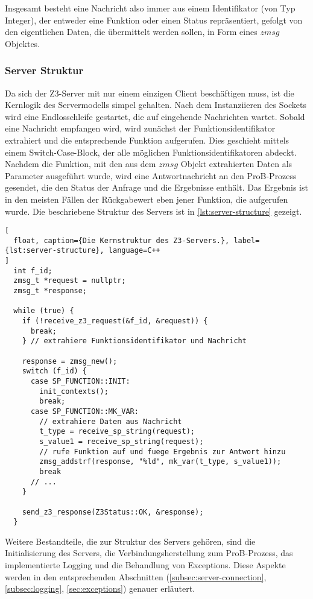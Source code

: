 Insgesamt besteht eine Nachricht also immer aus einem Identifikator (von Typ Integer), der entweder eine Funktion oder einen Status repräsentiert,
gefolgt von den eigentlichen Daten, die übermittelt werden sollen, in Form eines $zmsg$ Objektes.

\subsubsection{Server Struktur}

Da sich der Z3-Server mit nur einem einzigen Client beschäftigen muss, ist die Kernlogik des Servermodells simpel gehalten.
Nach dem Instanziieren des Sockets wird eine Endlosschleife gestartet, die auf eingehende Nachrichten wartet.
Sobald eine Nachricht empfangen wird, wird zunächst der Funktionsidentifikator extrahiert und die entsprechende Funktion aufgerufen.
Dies geschieht mittels einem Switch-Case-Block, der alle möglichen Funktionsidentifikatoren abdeckt.
Nachdem die Funktion, mit den aus dem $zmsg$ Objekt extrahierten Daten als Parameter ausgeführt wurde,
wird eine Antwortnachricht an den ProB-Prozess gesendet, die den Status der Anfrage und die Ergebnisse enthält.
Das Ergebnis ist in den meisten Fällen der Rückgabewert eben jener Funktion, die aufgerufen wurde.
Die beschriebene Struktur des Servers ist in \cref{lst:server-structure} gezeigt.

\begin{lstlisting}[
  float, caption={Die Kernstruktur des Z3-Servers.}, label={lst:server-structure}, language=C++
]
  int f_id;
  zmsg_t *request = nullptr;
  zmsg_t *response;

  while (true) {
    if (!receive_z3_request(&f_id, &request)) {
      break;
    } // extrahiere Funktionsidentifikator und Nachricht

    response = zmsg_new();
    switch (f_id) {
      case SP_FUNCTION::INIT:
        init_contexts();
        break;
      case SP_FUNCTION::MK_VAR:
        // extrahiere Daten aus Nachricht
        t_type = receive_sp_string(request);
        s_value1 = receive_sp_string(request);
        // rufe Funktion auf und fuege Ergebnis zur Antwort hinzu
        zmsg_addstrf(response, "%ld", mk_var(t_type, s_value1));
        break
      // ...
    }

    send_z3_response(Z3Status::OK, &response);
  }
\end{lstlisting}

Weitere Bestandteile, die zur Struktur des Servers gehören, sind die Initialisierung des Servers, die Verbindungsherstellung zum ProB-Prozess,
das implementierte Logging und die Behandlung von Exceptions.
Diese Aspekte werden in den entsprechenden Abschnitten (\cref{subsec:server-connection}, \cref{subsec:logging}, \cref{sec:exceptions}) genauer erläutert.


